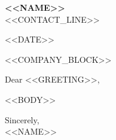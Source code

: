 \documentclass[11pt]{article}
\begin{document}
\begin{center}
{\Huge\bfseries <<NAME>>} \\[0.3em]
<<CONTACT_LINE>>
\end{center}

\vspace{0.5em}
<<DATE>>

<<COMPANY_BLOCK>>

\vspace{0.3em}
Dear <<GREETING>>,

<<BODY>>

Sincerely, \\
<<NAME>>
\end{document}
